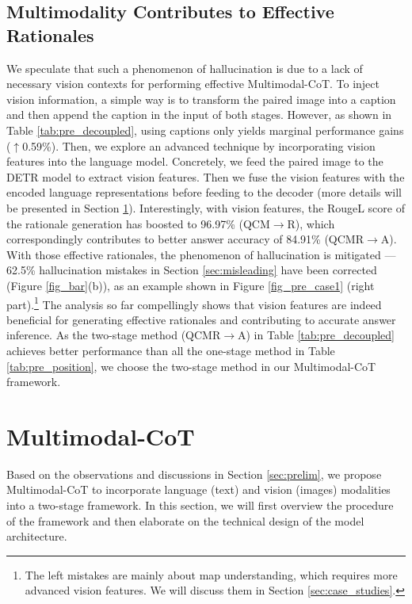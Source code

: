 \documentclass[nohyperref]{article}
\theoremstyle{plain}
\theoremstyle{definition}
\theoremstyle{remark}
\begin{document}
\subsection{Multimodality Contributes to Effective Rationales}\label{sec:multimodal}
We speculate that such a phenomenon of hallucination is due to a lack of necessary vision contexts for performing effective Multimodal-CoT. To inject vision information, a simple way is to transform the paired image into a caption \citep{lu2022learn} and then append the caption in the input of both stages. However, as shown in Table \ref{tab:pre_decoupled}, using captions only yields marginal performance gains ($\uparrow$0.59\%). Then, we explore an advanced technique by incorporating vision features into the language model. Concretely, we feed the paired image to the DETR model \citep{carion2020end} to extract vision features. Then we fuse the vision features with the encoded language representations before feeding to the decoder (more details will be presented in Section \ref{sec:mm_cot}). Interestingly, with vision features, the RougeL score of the rationale generation has boosted to 96.97\% (QCM$\rightarrow$R), which correspondingly contributes to better answer accuracy of 84.91\% (QCMR$\rightarrow$A).
With those effective rationales, the phenomenon of hallucination is mitigated --- 62.5\% hallucination mistakes in Section \ref{sec:misleading} have been corrected (Figure \ref{fig_bar}(b)), as an example shown in Figure \ref{fig_pre_case1} (right part).\footnote{The left mistakes are mainly about map understanding, which requires more advanced vision features. We will discuss them in Section \ref{sec:case_studies}.} The analysis so far compellingly shows that vision features are indeed beneficial for generating effective rationales and contributing to accurate answer inference. {As the two-stage method (QCMR$\rightarrow$A) in Table \ref{tab:pre_decoupled} achieves better performance than all the {one-stage} method in Table \ref{tab:pre_position}, we choose the two-stage method in our Multimodal-CoT framework.}



\section{Multimodal-CoT}\label{sec:mm_cot}
Based on the observations and discussions in Section \ref{sec:prelim}, {we propose Multimodal-CoT to incorporate language (text) and vision (images) modalities into a two-stage framework.} In this section, we will first overview the procedure of the framework and then elaborate on the technical design of the model architecture.
\end{document}
